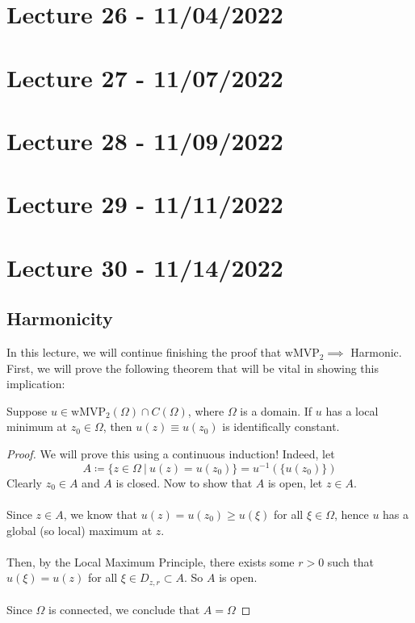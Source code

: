 \documentclass{article}
\begin{document}
\section{Lecture 26 - 11/04/2022}

\section{Lecture 27 - 11/07/2022}

\section{Lecture 28 - 11/09/2022}

\section{Lecture 29 - 11/11/2022}

\section{Lecture 30 - 11/14/2022}

\subsection{Harmonicity}

In this lecture, we will continue finishing the proof that $\text{wMVP}_2 \implies $ Harmonic. First, we will prove the following theorem that will be vital in showing this implication:

\begin{theorem}
Suppose $u \in \text{wMVP}_2(\Omega) \cap C(\Omega)$, where $\Omega$ is a domain. If $u$ has a local minimum at $z_0 \in \Omega$, then $u(z) \equiv u(z_0)$ is identifically constant.
\end{theorem}

\begin{proof}
    We will prove this using a continuous induction! Indeed, let
    \[A \coloneqq \{z \in \Omega\ |\ u(z) = u(z_0)\} = u^{-1}(\{u(z_0)\})\]
    Clearly $z_0 \in A$ and $A$ is closed. Now to show that $A$ is open, let $z \in A$.\\\\
    Since $z \in A$, we know that $u(z) = u(z_0) \geq u(\xi)$ for all $\xi \in \Omega$, hence $u$ has a global (so local) maximum at $z$.\\\\
    Then, by the Local Maximum Principle, there exists some $r > 0$ such that $u(\xi) = u(z)$ for all $\xi \in D_{z, r} \subset A$. So $A$ is open.\\\\
    Since $\Omega$ is connected, we conclude that $A = \Omega$
\end{proof}
\end{document}
